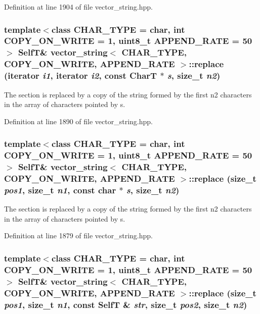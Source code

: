 Definition at line 1904 of file vector\_\-string.hpp.\hypertarget{classvector__string_02f74c9a49dca62cf406f8d4333b5b26}{
\subsubsection[{replace}]{\setlength{\rightskip}{0pt plus 5cm}template$<$class CHAR\_\-TYPE  = char, int COPY\_\-ON\_\-WRITE = 1, uint8\_\-t APPEND\_\-RATE = 50$>$ {\bf SelfT}\& {\bf vector\_\-string}$<$ CHAR\_\-TYPE, COPY\_\-ON\_\-WRITE, APPEND\_\-RATE $>$::replace (iterator {\em i1}, \/  iterator {\em i2}, \/  const CharT $\ast$ {\em s}, \/  size\_\-t {\em n2})}}
\label{classvector__string_02f74c9a49dca62cf406f8d4333b5b26}


The section is replaced by a copy of the string formed by the first n2 characters in the array of characters pointed by s. 

Definition at line 1890 of file vector\_\-string.hpp.\hypertarget{classvector__string_75a0a425571b008d49608cbaeaa009bd}{
\subsubsection[{replace}]{\setlength{\rightskip}{0pt plus 5cm}template$<$class CHAR\_\-TYPE  = char, int COPY\_\-ON\_\-WRITE = 1, uint8\_\-t APPEND\_\-RATE = 50$>$ {\bf SelfT}\& {\bf vector\_\-string}$<$ CHAR\_\-TYPE, COPY\_\-ON\_\-WRITE, APPEND\_\-RATE $>$::replace (size\_\-t {\em pos1}, \/  size\_\-t {\em n1}, \/  const char $\ast$ {\em s}, \/  size\_\-t {\em n2})}}
\label{classvector__string_75a0a425571b008d49608cbaeaa009bd}


The section is replaced by a copy of the string formed by the first n2 characters in the array of characters pointed by s. 

Definition at line 1879 of file vector\_\-string.hpp.\hypertarget{classvector__string_7721190d3b203c2debdde8decc8b4805}{
\subsubsection[{replace}]{\setlength{\rightskip}{0pt plus 5cm}template$<$class CHAR\_\-TYPE  = char, int COPY\_\-ON\_\-WRITE = 1, uint8\_\-t APPEND\_\-RATE = 50$>$ {\bf SelfT}\& {\bf vector\_\-string}$<$ CHAR\_\-TYPE, COPY\_\-ON\_\-WRITE, APPEND\_\-RATE $>$::replace (size\_\-t {\em pos1}, \/  size\_\-t {\em n1}, \/  const {\bf SelfT} \& {\em str}, \/  size\_\-t {\em pos2}, \/  size\_\-t {\em n2})}}
\label{classvector__string_7721190d3b203c2debdde8decc8b4805}


